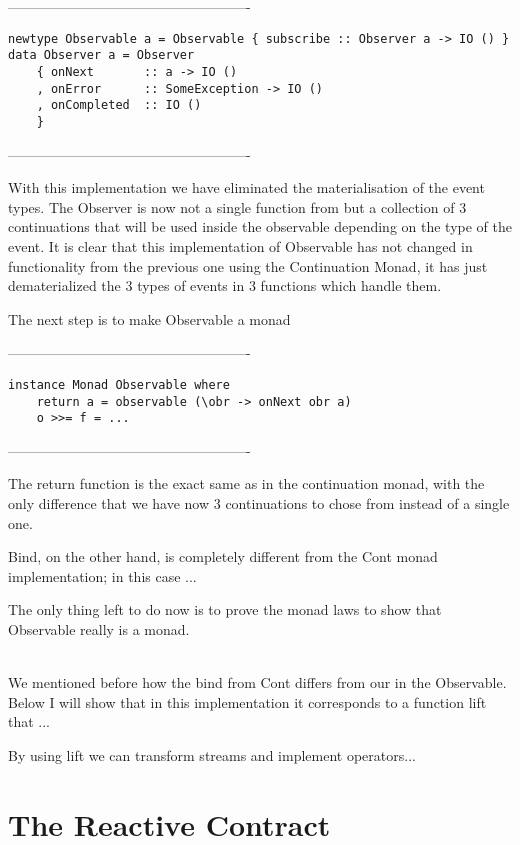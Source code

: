 ----------------------------------------------------
\begin{verbatim}
newtype Observable a = Observable { subscribe :: Observer a -> IO () } 
data Observer a = Observer 
    { onNext       :: a -> IO ()
    , onError      :: SomeException -> IO ()
    , onCompleted  :: IO ()
    }
\end{verbatim}
----------------------------------------------------    

With this implementation we have eliminated the materialisation of the event types. The Observer is now not a single function from  but a collection of 3 continuations that will be used inside the observable depending on the type of the event. It is clear that this implementation of Observable has not changed in functionality from the previous one using the Continuation Monad, it has just dematerialized the 3 types of events in 3 functions which handle them.

The next step is to make Observable a monad

----------------------------------------------------
\begin{verbatim}
instance Monad Observable where
	return a = observable (\obr -> onNext obr a)
	o >>= f = ...
\end{verbatim}
----------------------------------------------------  

The return function is the exact same as in the continuation monad, with the only difference that we have now 3 continuations to chose from instead of a single one. 

Bind, on the other hand, is completely different from the Cont monad implementation; in this case ... 

The only thing left to do now is to prove the monad laws to show that Observable really is a monad.

\\

We mentioned before how the bind from Cont differs from our in the Observable. Below I will show that in this implementation it corresponds to a function lift that ... 

By using lift we can transform streams and implement operators...



\section{The Reactive Contract}